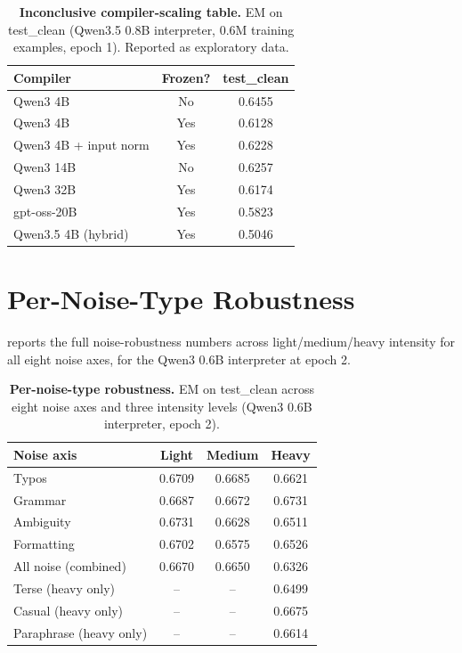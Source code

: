 \begin{table}[!h]
\centering
\caption{\label{tab:compiler_scaling}\textbf{Inconclusive compiler-scaling table.} EM on test\_clean (Qwen3.5 0.8B interpreter, 0.6M training examples, epoch 1). Reported as exploratory data.}
\small
\setlength{\tabcolsep}{8pt}
\begin{tabular}{@{}lcc@{}}
\toprule
Compiler & Frozen? & test\_clean \\
\midrule
Qwen3 4B               & No  & 0.6455 \\
Qwen3 4B               & Yes & 0.6128 \\
Qwen3 4B + input norm  & Yes & 0.6228 \\
Qwen3 14B              & No  & 0.6257 \\
Qwen3 32B              & Yes & 0.6174 \\
gpt-oss-20B            & Yes & 0.5823 \\
Qwen3.5 4B (hybrid)    & Yes & 0.5046 \\
\bottomrule
\end{tabular}
\end{table}


\section{Per-Noise-Type Robustness}
\label{appendix:noise_full}

 reports the full noise-robustness numbers across light/medium/heavy intensity for all eight noise axes, for the Qwen3 0.6B interpreter at epoch 2.

\begin{table}[!h]
\centering
\caption{\label{tab:noise_full}\textbf{Per-noise-type robustness.} EM on test\_clean across eight noise axes and three intensity levels (Qwen3 0.6B interpreter, epoch 2).}
\small
\setlength{\tabcolsep}{4pt}
\begin{tabular}{@{}lccc@{}}
\toprule
Noise axis & Light & Medium & Heavy \\
\midrule
Typos                 & 0.6709 & 0.6685 & 0.6621 \\
Grammar               & 0.6687 & 0.6672 & 0.6731 \\
Ambiguity             & 0.6731 & 0.6628 & 0.6511 \\
Formatting            & 0.6702 & 0.6575 & 0.6526 \\
All noise (combined)  & 0.6670 & 0.6650 & 0.6326 \\
\midrule
Terse (heavy only)        & --     & --     & 0.6499 \\
Casual (heavy only)       & --     & --     & 0.6675 \\
Paraphrase (heavy only)   & --     & --     & 0.6614 \\
\bottomrule
\end{tabular}
\end{table}


